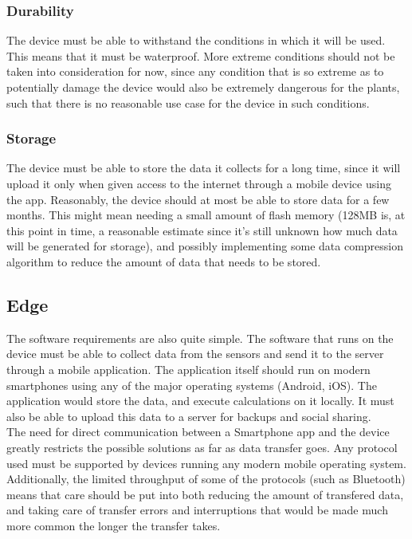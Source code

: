 \subsubsection{Durability}
The device must be able to withstand the conditions in which it will be used. This
means that it must be waterproof. More extreme conditions should not be taken into
consideration for now, since any condition that is so extreme as to potentially
damage the device would also be extremely dangerous for the plants, such that there
is no reasonable use case for the device in such conditions.

\subsubsection{Storage}
The device must be able to store the data it collects for a long time, since it will
upload it only when given access to the internet through a mobile device using the
app. Reasonably, the device should at most be able to store data for a few months.
This might mean needing a small amount of flash memory (128MB is, at this point in time,
a reasonable estimate since it's still unknown how much data will be generated for
storage), and possibly implementing some data compression algorithm to reduce the
amount of data that needs to be stored.

\subsection{Edge}
The software requirements are also quite simple. The software that runs on the device
must be able to collect data from the sensors and send it to the server through a
mobile application. The application itself should run on modern smartphones using
any of the major operating systems (Android, iOS). The application would store the
data, and execute calculations on it locally. It must also be able to upload this
data to a server for backups and social sharing.\\
The need for direct communication between a Smartphone app and the device greatly
restricts the possible solutions as far as data transfer goes. Any protocol used
must be supported by devices running any modern mobile operating system. Additionally,
the limited throughput of some of the protocols (such as Bluetooth) means that care
should be put into both reducing the amount of transfered data, and taking care of
transfer errors and interruptions that would be made much more common the longer
the transfer takes.

